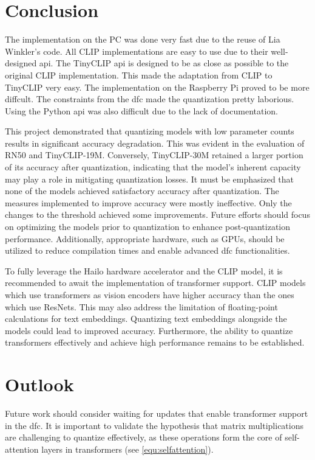 \section{Conclusion}
The implementation on the PC was done very fast due to the reuse of Lia Winkler's code.
All CLIP implementations are easy to use due to their well-designed \acrshort{api}.
The TinyCLIP \acrshort{api} is designed to be as close as possible to the original CLIP implementation.
This made the adaptation from CLIP to TinyCLIP very easy.
The implementation on the Raspberry Pi proved to be more diffcult.
The constraints from the \acrshort{dfc} made the quantization pretty laborious.
Using the Python \acrshort{api} was also difficult due to the lack of documentation.

This project demonstrated that quantizing models with low parameter counts results in significant accuracy degradation.
This was evident in the evaluation of RN50 and TinyCLIP-19M.  
Conversely, TinyCLIP-30M retained a larger portion of its accuracy after quantization, indicating that the model's inherent capacity may play a role in mitigating quantization losses.  
It must be emphasized that none of the models achieved satisfactory accuracy after quantization.  
The measures implemented to improve accuracy were mostly ineffective.
Only the changes to the threshold achieved some improvements. 
Future efforts should focus on optimizing the models prior to quantization to enhance post-quantization performance.  
Additionally, appropriate hardware, such as GPUs, should be utilized to reduce compilation times and enable advanced \acrshort{dfc} functionalities.  

To fully leverage the Hailo hardware accelerator and the CLIP model, it is recommended to await the implementation of transformer support.
CLIP models which use transformers as vision encoders have higher accuracy than the ones which use ResNets. 
This may also address the limitation of floating-point calculations for text embeddings.  
Quantizing text embeddings alongside the models could lead to improved accuracy.  
Furthermore, the ability to quantize transformers effectively and achieve high performance remains to be established.  
% 

\section{Outlook}
Future work should consider waiting for updates that enable transformer support in the \acrshort{dfc}.  
It is important to validate the hypothesis that matrix multiplications are challenging to quantize effectively, as these operations form the core of self-attention layers in transformers (see \cref{equ:selfattention}).  

